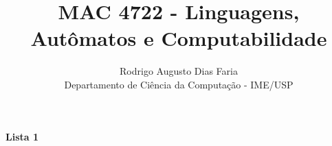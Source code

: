 \documentclass[12pt]{article}
\begin{document}
\title{MAC 4722 - Linguagens, Autômatos e Computabilidade}
\author{Rodrigo Augusto Dias Faria\\
Departamento de Ciência da Computação - IME/USP}

\maketitle

\begin{center}
\textbf{\large{Lista 1}}
\end{center}



\end{document}
